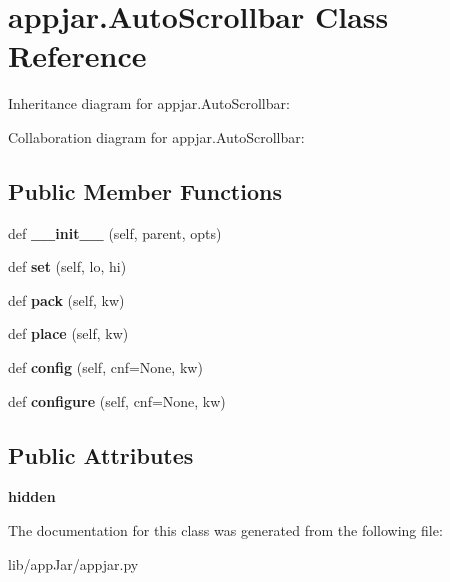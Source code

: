 \hypertarget{classappjar_1_1_auto_scrollbar}{}\section{appjar.\+Auto\+Scrollbar Class Reference}
\label{classappjar_1_1_auto_scrollbar}


Inheritance diagram for appjar.\+Auto\+Scrollbar\+:


Collaboration diagram for appjar.\+Auto\+Scrollbar\+:
\subsection*{Public Member Functions}
\begin{DoxyCompactItemize}
\item 
\mbox{\label{classappjar_1_1_auto_scrollbar_a15d40e629a8f2675664928c85b7b1c22}} 
def {\bfseries \+\_\+\+\_\+init\+\_\+\+\_\+} (self, parent, opts)
\item 
\mbox{\label{classappjar_1_1_auto_scrollbar_ae4f54eff053467132339d7f779ddb656}} 
def {\bfseries set} (self, lo, hi)
\item 
\mbox{\label{classappjar_1_1_auto_scrollbar_a272c56f59ff29937d40093f50b32df2c}} 
def {\bfseries pack} (self, kw)
\item 
\mbox{\label{classappjar_1_1_auto_scrollbar_a261565289abf0e775cd2abc399c288c4}} 
def {\bfseries place} (self, kw)
\item 
\mbox{\label{classappjar_1_1_auto_scrollbar_aea114d2fa5f5db395bea06a23cfd4557}} 
def {\bfseries config} (self, cnf=None, kw)
\item 
\mbox{\label{classappjar_1_1_auto_scrollbar_a3fc132557ed01fce301c9292e25510d8}} 
def {\bfseries configure} (self, cnf=None, kw)
\end{DoxyCompactItemize}
\subsection*{Public Attributes}
\begin{DoxyCompactItemize}
\item 
\mbox{\label{classappjar_1_1_auto_scrollbar_aaa45f8e9996408e679c10d7fc319ee83}} 
{\bfseries hidden}
\end{DoxyCompactItemize}


The documentation for this class was generated from the following file\+:\begin{DoxyCompactItemize}
\item 
lib/app\+Jar/appjar.\+py\end{DoxyCompactItemize}
